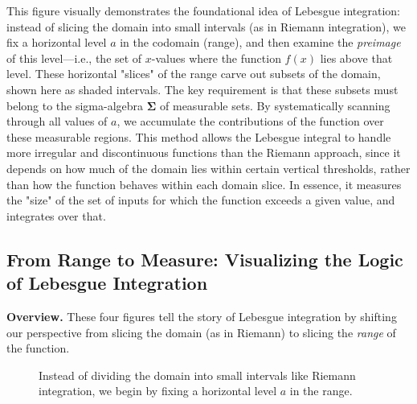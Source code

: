 This figure visually demonstrates the foundational idea of Lebesgue integration: instead of slicing the domain into small intervals (as in Riemann integration), we fix a horizontal level \( a \) in the codomain (range), and then examine the \emph{preimage} of this level—i.e., the set of \( x \)-values where the function \( f(x) \) lies above that level. These horizontal "slices" of the range carve out subsets of the domain, shown here as shaded intervals. The key requirement is that these subsets must belong to the sigma-algebra \( \boldsymbol{\Sigma} \) of measurable sets. By systematically scanning through all values of \( a \), we accumulate the contributions of the function over these measurable regions. This method allows the Lebesgue integral to handle more irregular and discontinuous functions than the Riemann approach, since it depends on how much of the domain lies within certain vertical thresholds, rather than how the function behaves within each domain slice. In essence, it measures the "size" of the set of inputs for which the function exceeds a given value, and integrates over that.



\subsection{From Range to Measure: Visualizing the Logic of Lebesgue Integration}

\textbf{Overview.} These four figures tell the story of Lebesgue integration by shifting our perspective from slicing the domain (as in Riemann) to slicing the \emph{range} of the function.

\begin{figure}[H]
\centering
{}
\caption{Instead of dividing the domain into small intervals like Riemann integration, we begin by fixing a horizontal level $a$ in the range.}
\end{figure}


